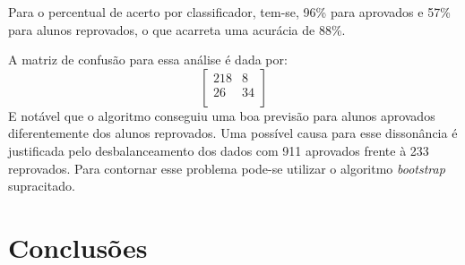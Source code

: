 \documentclass{article}
\begin{document}
Para o percentual de acerto por classificador, tem-se, 96\% para aprovados e 57\% para alunos reprovados, o que acarreta uma acurácia de 88\%.

A matriz de confusão para essa análise é dada por:
\[
\begin{bmatrix}
    218 & 8 \\
    26 & 34 \\
\end{bmatrix} 
\]
E notável que o algoritmo conseguiu uma boa previsão para alunos aprovados diferentemente dos alunos reprovados. Uma possível causa para esse dissonância é justificada pelo desbalanceamento dos dados com 911 aprovados frente à 233 reprovados. Para contornar esse problema pode-se utilizar o algoritmo  \emph{bootstrap} supracitado.


\section{Conclusões}
		


 
\end{document}
